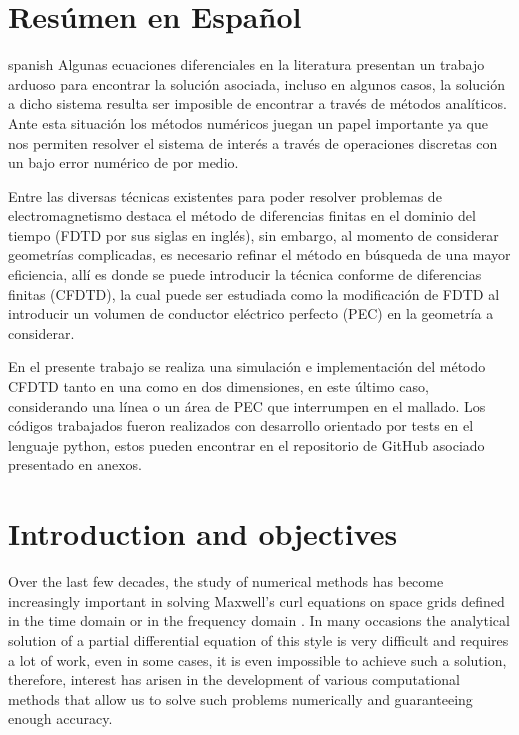 \documentclass[12pt, oneside]{book}
\begin{document}
\chapter*{Resúmen en Español}

\begin{otherlanguage*}{spanish}
    \indent Algunas ecuaciones diferenciales en la literatura presentan un trabajo arduoso para encontrar la solución asociada, incluso en algunos casos, la solución a dicho sistema resulta ser imposible de encontrar a través de métodos analíticos. Ante esta situación los métodos numéricos juegan un papel importante ya que nos permiten resolver el sistema de interés a través de operaciones discretas con un bajo error numérico de por medio. 

    \indent Entre las diversas técnicas existentes para poder resolver problemas de electromagnetismo destaca el método de diferencias finitas en el dominio del tiempo (FDTD por sus siglas en inglés), sin embargo, al momento de considerar geometrías complicadas, es necesario refinar el método en búsqueda de una mayor eficiencia, allí es donde se puede introducir la técnica conforme de diferencias finitas (CFDTD), la cual puede ser estudiada como la modificación de FDTD al introducir un volumen de conductor eléctrico perfecto (PEC) en la geometría a considerar.

    \indent En el presente trabajo se realiza una simulación e implementación del método CFDTD tanto en una como en dos dimensiones, en este último caso, considerando una línea o un área de PEC que interrumpen en el mallado. Los códigos trabajados fueron realizados con desarrollo orientado por tests en el lenguaje python, estos pueden encontrar en el repositorio de GitHub asociado presentado en anexos.
\end{otherlanguage*}

\chapter{Introduction and objectives}

Over the last few decades, the study of numerical methods has become increasingly important in solving Maxwell's curl equations on space grids defined in the time domain or in the frequency domain \cite{Taflove2005}. In many occasions the analytical solution of a partial differential equation of this style is very difficult and requires a lot of work, even in some cases, it is even impossible to achieve such a solution, therefore, interest has arisen in the development of various computational methods that allow us to solve such problems numerically and guaranteeing enough accuracy.
\end{document}
